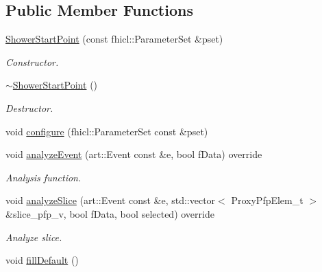 \subsection*{Public Member Functions}
\begin{DoxyCompactItemize}
\item 
\hyperlink{classanalysis_1_1ShowerStartPoint_a8e100ffb3b55c24b61b176551f4585e9}{Shower\+Start\+Point} (const fhicl\+::\+Parameter\+Set \&pset)
\begin{DoxyCompactList}\small\item\em Constructor. \end{DoxyCompactList}\item 
\hyperlink{classanalysis_1_1ShowerStartPoint_a79dfe7401b305731582274fe09244da1}{$\sim$\+Shower\+Start\+Point} ()\hypertarget{classanalysis_1_1ShowerStartPoint_a79dfe7401b305731582274fe09244da1}{}\label{classanalysis_1_1ShowerStartPoint_a79dfe7401b305731582274fe09244da1}

\begin{DoxyCompactList}\small\item\em Destructor. \end{DoxyCompactList}\item 
void \hyperlink{classanalysis_1_1ShowerStartPoint_a9a170015fd21db2dbc150a507adafb2b}{configure} (fhicl\+::\+Parameter\+Set const \&pset)
\item 
void \hyperlink{classanalysis_1_1ShowerStartPoint_aa6b9c7e1d18ca6b68dfbbaa9cb6dfdbe}{analyze\+Event} (art\+::\+Event const \&e, bool f\+Data) override
\begin{DoxyCompactList}\small\item\em Analysis function. \end{DoxyCompactList}\item 
void \hyperlink{classanalysis_1_1ShowerStartPoint_abefc8ff53cbb127bc0c25103e65324f2}{analyze\+Slice} (art\+::\+Event const \&e, std\+::vector$<$ Proxy\+Pfp\+Elem\+\_\+t $>$ \&slice\+\_\+pfp\+\_\+v, bool f\+Data, bool selected) override\hypertarget{classanalysis_1_1ShowerStartPoint_abefc8ff53cbb127bc0c25103e65324f2}{}\label{classanalysis_1_1ShowerStartPoint_abefc8ff53cbb127bc0c25103e65324f2}

\begin{DoxyCompactList}\small\item\em Analyze slice. \end{DoxyCompactList}\item 
void \hyperlink{classanalysis_1_1ShowerStartPoint_adf64ae771eb625703702728e91df9445}{fill\+Default} ()\hypertarget{classanalysis_1_1ShowerStartPoint_adf64ae771eb625703702728e91df9445}{}\label{classanalysis_1_1ShowerStartPoint_adf64ae771eb625703702728e91df9445}


\end{DoxyCompactItemize}
